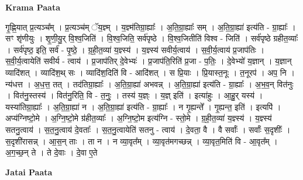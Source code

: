 \documentclass[17pt]{extarticle}
\begin{document}
\textbf{Krama Paata} \newline

गृ॒ह्णि॒यात् प्र॒त्यञ्च᳚म् । प्र॒त्यञ्च॑म् ॅय॒ज्ञ्म् । य॒ज्ञ्म॑तिग्रा॒ह्याः᳚ । अ॒ति॒ग्रा॒ह्याः᳚ सम् । अ॒ति॒ग्रा॒ह्या॑ इत्य॑ति - ग्रा॒ह्याः᳚ । सꣳ शृ॑णीयुः । शृ॒णी॒यु॒र् वि॒श्व॒जिति॑ । वि॒श्व॒जिति॒ सर्व॑पृष्ठे । वि॒श्व॒जितीति॑ विश्व - जिति॑ । सर्व॑पृष्ठे ग्रहीत॒व्याः᳚ । सर्व॑पृष्ठ॒ इति॒ सर्व॑ - पृ॒ष्ठे॒ । ग्र॒ही॒त॒व्या॑ य॒ज्ञ्स्य॑ । य॒ज्ञ्स्य॑ सवीर्य॒त्वाय॑ । स॒वी॒र्य॒त्वाय॑ प्र॒जाप॑तिः । स॒वी॒र्य॒त्वायेति॑ सवीर्य - त्वाय॑ । प्र॒जाप॑तिर् दे॒वेभ्यः॑ । प्र॒जाप॑ति॒रिति॑ प्र॒जा - प॒तिः॒ । दे॒वेभ्यो॑ य॒ज्ञान् । य॒ज्ञान् व्यादि॑शत् । व्यादि॑श॒थ् सः । व्यादि॑श॒दिति॑ वि - आदि॑शत् । स प्रि॒याः । प्रि॒यास्त॒नूः । त॒नूरप॑ । अप॒ नि । न्य॑धत्त । अ॒ध॒त्त॒ तत् । तद॑तिग्रा॒ह्याः᳚ । अ॒ति॒ग्रा॒ह्या॑ अभवन्न् । अ॒ति॒ग्रा॒ह्या॑ इत्य॑ति - ग्रा॒ह्याः᳚ । अ॒भ॒व॒न् वित॑नुः । वित॑नु॒स्तस्य॑ । वित॑नु॒रिति॒ वि - त॒नुः॒ । तस्य॑ य॒ज्ञ्ः । य॒ज्ञ् इति॑ । इत्या॑हुः । आ॒हु॒र् यस्य॑ । यस्या॑तिग्रा॒ह्याः᳚ । अ॒ति॒ग्रा॒ह्या॑ न । अ॒ति॒ग्रा॒ह्या॑ इत्य॑ति - ग्रा॒ह्याः᳚ । न गृ॒ह्यन्ते᳚ । गृ॒ह्यन्त॒ इति॑ । इत्यपि॑ । अप्य॑ग्निष्टो॒मे । अ॒ग्नि॒ष्टो॒मे ग्र॑हीत॒व्याः᳚ । अ॒ग्नि॒ष्टो॒म इत्य॑ग्नि - स्तो॒मे । ग्र॒ही॒त॒व्या॑ य॒ज्ञ्स्य॑ । य॒ज्ञ्स्य॑ सतनु॒त्वाय॑ । स॒त॒नु॒त्वाय॑ दे॒वताः᳚ । स॒त॒नु॒त्वायेति॑ सतनु - त्वाय॑ । दे॒वता॒ वै । वै सर्वाः᳚ । सर्वाः᳚ स॒दृशीः᳚ । स॒दृशी॑रासन्न् । आ॒स॒न् ताः । ता न । न व्या॒वृत᳚म् । व्या॒वृत॑मगच्छन्न् । व्या॒वृत॒मिति॑ वि - आ॒वृत᳚म् । अ॒ग॒च्छ॒न् ते । ते दे॒वाः । दे॒वा ए॒ते \newline

\textbf{Jatai Paata} \newline
\end{document}
